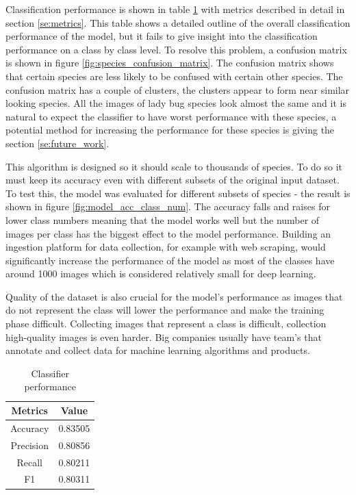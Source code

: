 \documentclass[times, utf8, diplomski]{fer}
\begin{document}
Classification performance is shown in table \ref{tb:classifier_performance} with metrics described in detail in section \ref{se:metrics}. This table shows a detailed outline of the overall classification performance of the model, but it fails to give insight into the classification performance on a class by class level. To resolve this problem, a confusion matrix is shown in figure \ref{fig:species_confusion_matrix}. The confusion matrix shows that certain species are less likely to be confused with certain other species. The confusion matrix has a couple of clusters, the clusters appear to form near similar looking species. All the images of lady bug species look almost the same and it is natural to expect the classifier to have worst performance with these species, a potential method for increasing the performance for these species is giving the section \ref{se:future_work}.

This algorithm is designed so it should scale to thousands of species. To do so it must keep its accuracy even with different subsets of the original input dataset. To test this, the model was evaluated for different subsets of species - the result is shown in figure \ref{fig:model_acc_class_num}. The accuracy falls and raises for lower class numbers meaning that the model works well but the number of images per class has the biggest effect to the model performance. Building an ingestion platform for data collection, for example with web scraping, would significantly increase the performance of the model as most of the classes have around 1000 images which is considered relatively small for deep learning. 

Quality of the dataset is also crucial for the model's performance as images that do not represent the class will lower the performance and make the training phase difficult. Collecting images that represent a class is difficult, collection high-quality images is even harder. Big companies usually have team's that annotate and collect data for machine learning algorithms and products.

\begin{table}
\centering
\caption{Classifier performance}
\label{tb:classifier_performance}
\begin{tabular}{cc}
\hline 
Metrics & Value \\ \hline 
Accuracy &  0.83505\\ 
Precision & 0.80856 \\ 
Recall & 0.80211 \\
F1 & 0.80311 \\
\hline 
\end{tabular} 
\end{table}
\end{document}
